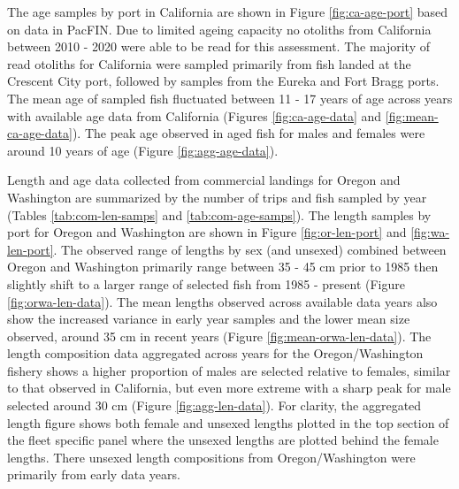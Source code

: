 \documentclass[11pt,
  english,
  a4paper,
]{article}
\begin{document}
\leavevmode\tagmcend\tagstructend\par


The age samples by port in California are shown in Figure \ref{fig:ca-age-port} based on data in PacFIN. Due to limited ageing capacity no otoliths from California between 2010 - 2020 were able to be read for this assessment. The majority of read otoliths for California were sampled primarily from fish landed at the Crescent City port, followed by samples from the Eureka and Fort Bragg ports. The mean age of sampled fish fluctuated between 11 - 17 years of age across years with available age data from California (Figures \ref{fig:ca-age-data} and \ref{fig:mean-ca-age-data}). The peak age observed in aged fish for males and females were around 10 years of age (Figure \ref{fig:agg-age-data}).

\leavevmode\tagmcend\tagstructend\par


Length and age data collected from commercial landings for Oregon and Washington are summarized by the number of trips and fish sampled by year (Tables \ref{tab:com-len-samps} and \ref{tab:com-age-samps}). The length samples by port for Oregon and Washington are shown in Figure \ref{fig:or-len-port} and \ref{fig:wa-len-port}. The observed range of lengths by sex (and unsexed) combined between Oregon and Washington primarily range between 35 - 45 cm prior to 1985 then slightly shift to a larger range of selected fish from 1985 - present (Figure \ref{fig:orwa-len-data}). The mean lengths observed across available data years also show the increased variance in early year samples and the lower mean size observed, around 35 cm in recent years (Figure \ref{fig:mean-orwa-len-data}). The length composition data aggregated across years for the Oregon/Washington fishery shows a higher proportion of males are selected relative to females, similar to that observed in California, but even more extreme with a sharp peak for male selected around 30 cm (Figure \ref{fig:agg-len-data}). For clarity, the aggregated length figure shows both female and unsexed lengths plotted in the top section of the fleet specific panel where the unsexed lengths are plotted behind the female lengths. There unsexed length compositions from Oregon/Washington were primarily from early data years.

\leavevmode\tagmcend\tagstructend\par
\end{document}
